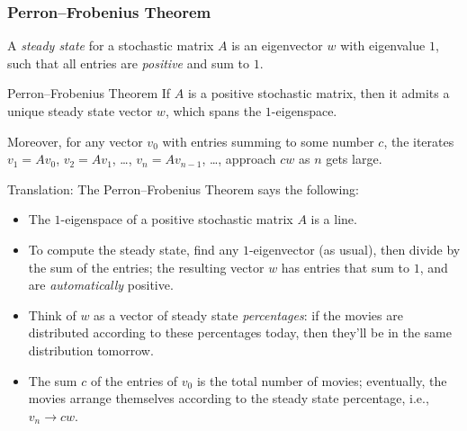 \begin{frame}
\frametitle{Perron--Frobenius Theorem}

\vskip-3mm
\begin{defn}
  A \emph{steady state} for a stochastic matrix $A$ is an eigenvector $w$ with
  eigenvalue $1$, such that all entries are \emph{positive} and sum to $1$.
\end{defn}

\pause
\begin{oneoffthm}{Perron--Frobenius Theorem}
  If $A$ is a positive stochastic matrix, then it admits a unique steady state
  vector $w$, which spans the $1$-eigenspace.

  \pause\smallskip
  Moreover, for any vector $v_0$ with entries summing to some number
  $c$, the iterates $v_1 = Av_0$, $v_2 = Av_1$, \ldots, $v_n = Av_{n-1}$,
  \ldots, approach $cw$ as $n$ gets large.
\end{oneoffthm}

\pause\medskip
\alert{Translation:} The Perron--Frobenius Theorem says the following:
\pause
\begin{itemize}
\item The $1$-eigenspace of a positive stochastic matrix $A$ is a line.
  \pause
\item To compute the steady state, find any $1$-eigenvector (as usual), then
  divide by the sum of the entries; the resulting vector $w$ has entries that
  sum to $1$, and are \emph{automatically} positive.
  \pause
\item Think of $w$ as a vector of steady state \emph{percentages}: if the movies
  are distributed according to these percentages today, then they'll be in
  the same distribution tomorrow.
\pause
\item The sum $c$ of the entries of $v_0$ is the total number of movies;
  eventually, the movies arrange themselves according to the steady state
  percentage, i.e., $v_n \to c w$.
\end{itemize}

\end{frame}



